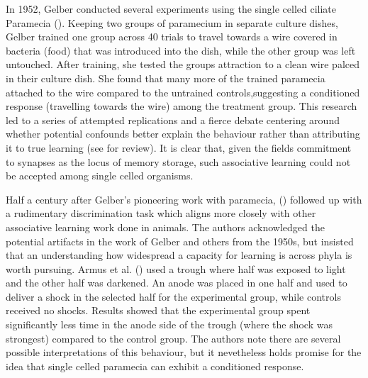 \documentclass[
  jou,
  floatsintext,
  longtable,
  nolmodern,
  notxfonts,
  notimes,
  donotrepeattitle,
  colorlinks=true,linkcolor=blue,citecolor=blue,urlcolor=blue]{apa7}
\begin{document}
In 1952, Gelber conducted several experiments using the single celled
ciliate Paramecia (). Keeping two groups of paramecium in separate culture dishes,
Gelber trained one group across 40 trials to travel towards a wire
covered in bacteria (food) that was introduced into the dish, while the
other group was left untouched. After training, she tested the groups
attraction to a clean wire palced in their culture dish. She found that
many more of the trained paramecia attached to the wire compared to the
untrained controls,suggesting a conditioned response (travelling towards
the wire) among the treatment group. This research led to a series of
attempted replications and a fierce debate centering around whether
potential confounds better explain the behaviour rather than attributing
it to true learning (see
 for
review). It is clear that, given the fields commitment to synapses as
the locus of memory storage, such associative learning could not be
accepted among single celled organisms.

Half a century after Gelber's pioneering work with paramecia,
() followed
up with a rudimentary discrimination task which aligns more closely with
other associative learning work done in animals. The authors
acknowledged the potential artifacts in the work of Gelber and others
from the 1950s, but insisted that an understanding how widespread a
capacity for learning is across phyla is worth pursuing. Armus et al.
() used a trough where
half was exposed to light and the other half was darkened. An anode was
placed in one half and used to deliver a shock in the selected half for
the experimental group, while controls received no shocks. Results
showed that the experimental group spent significantly less time in the
anode side of the trough (where the shock was strongest) compared to the
control group. The authors note there are several possible
interpretations of this behaviour, but it nevetheless holds promise for
the idea that single celled paramecia can exhibit a conditioned
response.
\end{document}
